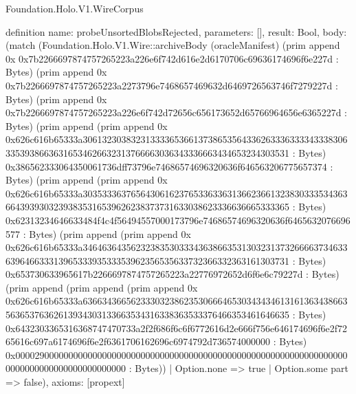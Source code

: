 \begin{lexlean}{Foundation.Holo.V1.WireCorpus}
\begin{semanticmodule}
definition{
  name: probeUnsortedBlobsRejected,
  parameters: [],
  result: Bool,
  body: (match (Foundation.Holo.V1.Wire::archiveBody (oracleManifest) (prim append 0x 0x7b2266697874757265223a226e6f742d616e2d6170706c69636174696f6e227d : Bytes) (prim append 0x 0x7b2266697874757265223a2273796e7468657469632d6469726563746f7279227d : Bytes) (prim append 0x 0x7b2266697874757265223a226e6f742d72656c656173652d65766964656e6365227d : Bytes) (prim append (prim append 0x 0x626c616b65333a306132303832313333653661373865356433626333633334333830633539386636316534626632313766663036343336663434653234303531 : Bytes) 0x386562333064350061736dff73796e74686574696320636f646563206775657374 : Bytes) (prim append (prim append 0x 0x626c616b65333a303533363765643061623765336336313662366132383033353436366439393032393835316539626238373731633038623336636665333365 : Bytes) 0x62313234646633484f4c4f56494557000173796e74686574696320636f6465632076696577 : Bytes) (prim append (prim append 0x 0x626c616b65333a346463643562323835303334363866353130323137326666373463363964663331396533393533353962356535633732366332363161303731 : Bytes) 0x653730633965617b2266697874757265223a22776972652d6f6e6c79227d : Bytes) (prim append (prim append (prim append 0x 0x626c616b65333a636634366562333032386235306664653034343461316136343866356365376362613934303133663534316338363533376466353461646635 : Bytes) 0x6432303365316368747470733a2f2f686f6c6f6772616d2e666f756e646174696f6e2f7265616c697a6174696f6e2f6361706162696c6974792d736574000000 : Bytes) 0x0000290000000000000000000000000000000000000000000000000000000000000000000000000000000000000000 : Bytes))
    | Option.none => true
    | Option.some part => false),
  axioms: [propext]
}


\end{semanticmodule}
\end{lexlean}
